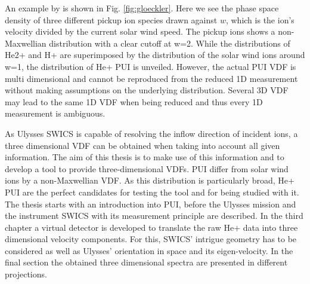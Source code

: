 An example by \citet{gloeckler1999} is shown in Fig. \ref{fig:gloeckler}. Here we see the phase space density of three different pickup ion species drawn against $w$, which is the ion's velocity divided by the current solar wind speed. The pickup ions shows a non-Maxwellian distribution with a clear cutoff at w=2. While the distributions of He2+ and H+ are superimposed by the distribution of the solar wind ions around w=1, the distribution of He+ PUI is unveiled.  
However, the actual PUI VDF is multi dimensional and cannot be reproduced from the reduced 1D measurement without making assumptions on the underlying distribution.
Several 3D VDF may lead to the same 1D VDF when being reduced and thus every 1D measurement is ambiguous.

As Ulysses SWICS is capable of resolving the inflow direction of incident ions, a three dimensional VDF can be obtained when taking into account all given information.
The aim of this thesis is to make use of this information and to develop a tool to provide three-dimensional VDFs. 
PUI differ from solar wind ions by a non-Maxwellian VDF. As this distribution is particularly broad, He+ PUI are the perfect candidates for testing the tool and for being studied with it.
\\
The thesis starts with an introduction into PUI, before the Ulysses mission and the instrument SWICS with its measurement principle are described. In the third chapter a virtual detector is developed to translate the raw He+ data into three dimensional velocity components. For this, SWICS' intrigue geometry has to be considered as well as Ulysses' orientation in space and its eigen-velocity. In the final section the obtained three dimensional spectra are presented in different projections.



